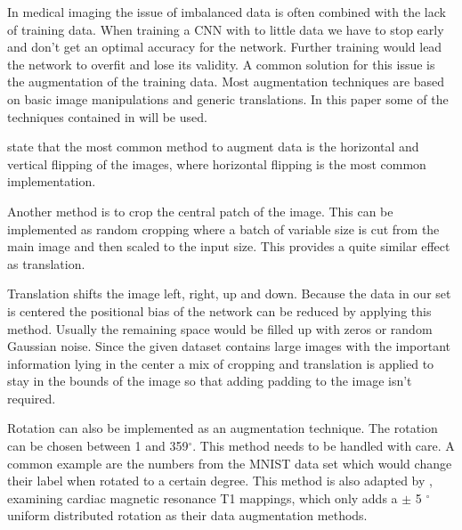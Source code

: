 \documentclass[
a4paper, 
12pt,
grayscalebody, %
abstract=on,
twoside, BCOR10mm, 12pt, DIV13,headinclude, footexclude, final, abstracton, openright
]{ibireprt}
\numberwithin{equation}{chapter}
\numberwithin{table}{chapter}
\numberwithin{figure}{chapter}
\numberwithin{algorithm}{chapter}
\numberwithin{example}{chapter}
\numberwithin{example}{chapter}
\begin{document}
In medical imaging the issue of imbalanced data is often combined with the lack of training data. When training a CNN with to little data we have to stop early and don't get an optimal accuracy for the network. Further training would lead the network to overfit and lose its validity. A common solution for this issue is the augmentation of the training data. Most augmentation techniques are based on basic image manipulations and generic translations. In this paper some of the techniques contained in \cite{Shorten2019} will be used.

\cite{Shorten2019} state that the most common method to augment data is the horizontal and vertical flipping of the images, where horizontal flipping is the most common implementation.

Another method is to crop the central patch of the image. This can be implemented as random cropping where a batch of variable size is cut from the main image and then scaled to the input size. This provides a quite similar effect as translation. 

Translation shifts the image left, right, up and down. Because the data in our set is centered the positional bias of the network can be reduced by applying this method. Usually the remaining space would be filled up with zeros or random Gaussian noise. Since the given dataset contains large images with the important information lying in the center a mix of cropping and translation is applied to stay in the bounds of the image so that adding padding to the image isn't required. 

Rotation can also be implemented as an augmentation technique. The rotation can be chosen between 1 and 359$^\circ$. This method needs to be handled with care. A common example are the numbers from the MNIST data set which would change their label when rotated to a certain degree. This method is also adapted by \cite{Zhang2020}, examining cardiac magnetic resonance T1 mappings, which only adds a $\pm$ 5 $^\circ$ uniform distributed rotation as their data augmentation methods. 


\end{document}
